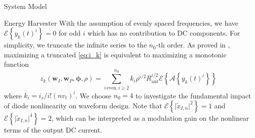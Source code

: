 \documentclass{IEEEtran}
\begin{document}
\begin{section}{System Model}
\begin{subsection}{Energy Harvester}
		With the assumption of evenly spaced frequencies, we have $\mathcal{E}\left\{y_k(t)^i\right\}=0$ for odd $i$ which has no contribution to DC components. For simplicity, we truncate the infinite series to the $n_0$-th order. As proved in \cite{Clerckx2016a}, maximizing a truncated \ref{eq:i_k} is equivalent to maximizing a monotonic function
		\begin{equation}\label{eq:z_k}
			z_k(\boldsymbol{w}_I,\boldsymbol{w}_P,\boldsymbol{\phi},\rho)=\sum_{i\,\text{even},i\ge2}^{n_0}{k_i}{\rho^{i/2}}{R_{\text{ant}}^{i/2}}{\mathcal{E}\left\{\mathcal{A}\left\{y_k(t)^i\right\}\right\}}
		\end{equation}
		where $k_i=i_s/i!(nv_t)^i$. We choose $n_0=4$ to investigate the fundamental impact of diode nonlinearity on waveform design. Note that $\mathcal{E}\left\{\lvert\tilde{x}_{I,n}\rvert^2\right\}=1$ and $\mathcal{E}\left\{\lvert\tilde{x}_{I,n}\rvert^4\right\}=2$, which can be interpreted as a modulation gain on the nonlinear terms of the output DC current.


\end{subsection}
\end{section}
\end{document}
